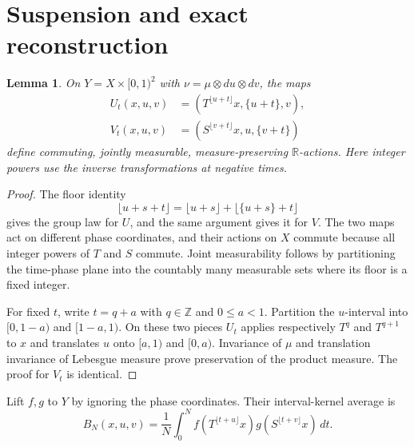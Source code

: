 \documentclass[11pt,a4paper]{article}
\newtheorem{lemma}[theorem]{Lemma}
\theoremstyle{definition}
\newenvironment{statementframe}
  {\par\addvspace{4pt}\noindent
   \setlength{\fboxsep}{6pt}\setlength{\fboxrule}{0.45pt}%
   \begin{lrbox}{\statementbox}%
   \begin{minipage}{\dimexpr\linewidth-2\fboxsep-2\fboxrule\relax}}
  {\end{minipage}\end{lrbox}%
   \fbox{\usebox{\statementbox}}\par\addvspace{4pt}}
\newcommand{\R}{\mathbb R}
\newcommand{\1}{\mathbf1}
\begin{document}
\section{Suspension and exact reconstruction}

\begin{statementframe}
\begin{lemma}\label{lem:suspension}
On $Y=X\times[0,1)^2$ with $\nu=\mu\otimes du\otimes dv$, the maps
\begin{align*}
 U_t(x,u,v)&=(T^{\lfloor u+t\rfloor}x,\{u+t\},v),\\
 V_t(x,u,v)&=(S^{\lfloor v+t\rfloor}x,u,\{v+t\})
\end{align*}
define commuting, jointly measurable, measure-preserving $\R$-actions.
Here integer powers use the inverse transformations at negative times.
\end{lemma}
\end{statementframe}
\begin{proof}
The floor identity
\[
 \lfloor u+s+t\rfloor
 =\lfloor u+s\rfloor+\lfloor\{u+s\}+t\rfloor
\]
gives the group law for $U$, and the same argument gives it for $V$.
The two maps act on different phase coordinates, and their actions on
$X$ commute because all integer powers of $T$ and $S$ commute.
Joint measurability follows by partitioning the time-phase plane into
the countably many measurable sets where its floor is a fixed integer.

For fixed $t$, write $t=q+a$ with $q\in\mathbb Z$ and $0\le a<1$.
Partition the $u$-interval into $[0,1-a)$ and $[1-a,1)$. On these two
pieces $U_t$ applies respectively $T^q$ and $T^{q+1}$ to $x$ and
translates $u$ onto $[a,1)$ and $[0,a)$. Invariance of $\mu$ and
translation invariance of Lebesgue measure prove preservation of the
product measure. The proof for $V_t$ is identical.
\end{proof}

Lift $f,g$ to $Y$ by ignoring the phase coordinates. Their interval-kernel
average is
\[
 B_N(x,u,v)=\frac1N\int_0^N
 f(T^{\lfloor t+u\rfloor}x)g(S^{\lfloor t+v\rfloor}x)\,dt.
\]
\end{document}
